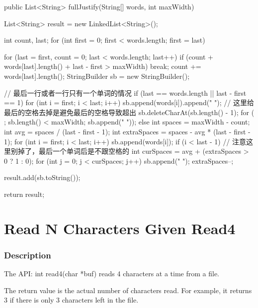 \begin{Code}
public List<String> fullJustify(String[] words, int maxWidth) {
    List<String> result = new LinkedList<String>();

    int count, last;
    for (int first = 0; first < words.length; first = last) {
        for (last = first, count = 0; last < words.length; last++) {
            if (count + words[last].length() + last - first > maxWidth) {
                break;
            }
            count += words[last].length();
        }
        StringBuilder sb = new StringBuilder();

        // 最后一行或者一行只有一个单词的情况
        if (last == words.length || last - first == 1) {
            for (int i = first; i < last; i++) {
                sb.append(words[i]).append(" ");
            }
            // 这里给最后的空格去掉是避免最后的空格导致超出
            sb.deleteCharAt(sb.length() - 1);
            for ( ; sb.length() < maxWidth; sb.append(" "));
        } else {
            int spaces = maxWidth - count;
            int avg = spaces / (last - first - 1);
            int extraSpaces = spaces - avg * (last - first - 1);
            for (int i = first; i < last; i++) {
                sb.append(words[i]);
                if (i < last - 1) { // 注意这里别掉了，最后一个单词后是不跟空格的
                    int curSpaces = avg + (extraSpaces > 0 ? 1 : 0);
                    for (int j = 0; j < curSpaces; j++) {
                        sb.append(" ");
                    }
                    extraSpaces--;
                }
            }
        }

        result.add(sb.toString());
    }

    return result;
}
\end{Code}

\newpage

\section{Read N Characters Given Read4} %

\subsubsection{Description}
The API: int read4(char *buf) reads 4 characters at a time from a file.

The return value is the actual number of characters read. For example, it returns 3 if there is only 3 characters left in the file.

